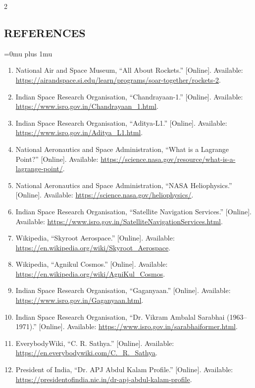 \begin{multicols}{2}
  \subsection*{\centering\uppercase{References}}
  \begingroup\justifying
  \Urlmuskip=0mu plus 1mu\relax
  \begin{enumerate}[leftmargin=*,itemsep=0.20em,topsep=0.12em,parsep=0pt]
    \item National Air and Space Museum, “All About Rockets.” [Online]. Available:
      \url{https://airandspace.si.edu/learn/programs/soar-together/rockets-2}.
    \item Indian Space Research Organisation, “Chandrayaan-1.” [Online]. Available:
      \url{https://www.isro.gov.in/Chandrayaan_1.html}.
    \item Indian Space Research Organisation, “Aditya-L1.” [Online]. Available:
      \url{https://www.isro.gov.in/Aditya_L1.html}.
    \item National Aeronautics and Space Administration, “What is a Lagrange Point?” [Online]. Available:
      \url{https://science.nasa.gov/resource/what-is-a-lagrange-point/}.
    \item National Aeronautics and Space Administration, “NASA Heliophysics.” [Online]. Available:
      \url{https://science.nasa.gov/heliophysics/}.
    \item Indian Space Research Organisation, “Satellite Navigation Services.” [Online]. Available:
      \url{https://www.isro.gov.in/SatelliteNavigationServices.html}.
    \item Wikipedia, “Skyroot Aerospace.” [Online]. Available:
      \url{https://en.wikipedia.org/wiki/Skyroot_Aerospace}.
    \item Wikipedia, “Agnikul Cosmos.” [Online]. Available:
      \url{https://en.wikipedia.org/wiki/AgniKul_Cosmos}.
    \item Indian Space Research Organisation, “Gaganyaan.” [Online]. Available:
      \url{https://www.isro.gov.in/Gaganyaan.html}.
    \item Indian Space Research Organisation, “Dr. Vikram Ambalal Sarabhai (1963–1971).” [Online].
      Available: \url{https://www.isro.gov.in/sarabhaiformer.html}.
    \item EverybodyWiki, “C. R. Sathya.” [Online]. Available:
      \url{https://en.everybodywiki.com/C._R._Sathya}.
    \item President of India, “Dr. APJ Abdul Kalam Profile.” [Online]. Available:
      \url{https://presidentofindia.nic.in/dr-apj-abdul-kalam-profile}.

\end{enumerate}
\end{multicols}
